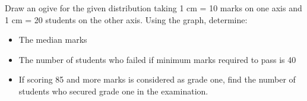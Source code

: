 \begin{enumerate}[label=(\roman*)]
        Draw an ogive for the given distribution taking 1 cm = 10 marks on one axis
        and 1 cm = 20 students on the other axis. Using the graph, determine:

        \begin{itemize}
            \item The median marks
            \item The number of students who failed if minimum marks required to pass is 40
            \item If scoring 85 and more marks is considered as grade one, find the 
                number of students who secured grade one in the examination.
        \end{itemize}


\end{enumerate}
